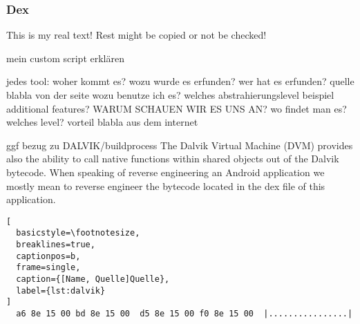 \subsubsection{Dex} \label{subsubsection:tools-dex}
This is my real text! Rest might be copied or not be checked!




mein custom script erklären

jedes tool:\newline
woher kommt es?\newline
wozu wurde es erfunden?\newline
wer hat es erfunden? quelle\newline
blabla von der seite\newline
wozu benutze ich es?\newline
welches abstrahierungslevel\newline
beispiel\newline
additional features?\newline
WARUM SCHAUEN WIR ES UNS AN?\newline
wo findet man es?\newline
welches level?\newline
vorteil\newline
blabla aus dem internet\newline

ggf bezug zu DALVIK/buildprocess
The Dalvik Virtual Machine (DVM) provides also the ability to call native functions within shared objects out of the Dalvik bytecode. When speaking of reverse engineering an Android application we mostly mean to reverse engineer the bytecode located in the dex file of this application.\newline

\begin{lstlisting}[
  basicstyle=\footnotesize,
  breaklines=true,
  captionpos=b,
  frame=single,
  caption={[Name, Quelle]Quelle},
  label={lst:dalvik}
]
  a6 8e 15 00 bd 8e 15 00  d5 8e 15 00 f0 8e 15 00  |................|
\end{lstlisting}
